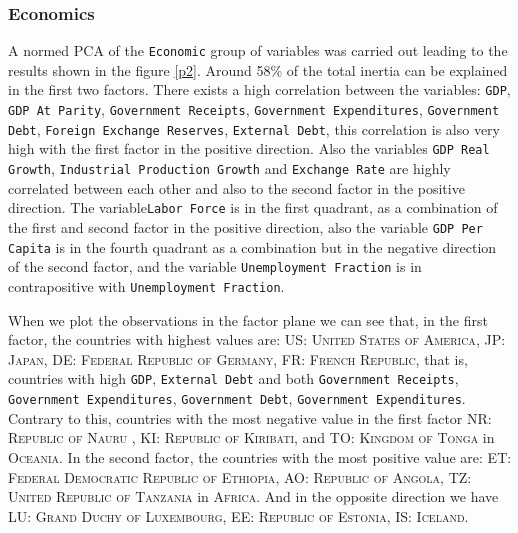\documentclass[a4paper,10pt,twocolumn]{article}
\begin{document}
\subsubsection{Economics}
A normed PCA of the \texttt{Economic} group of variables was carried out leading to the results shown in the figure \ref{p2}. Around 58\% of the total inertia can be explained in the first two factors. There exists a high correlation between the variables: \texttt{GDP}, \texttt{GDP At Parity}, \texttt{Government Receipts}, \texttt{Government Expenditures}, \texttt{Government Debt}, \texttt{Foreign Exchange Reserves}, \texttt{External Debt}, this correlation is also very high with the first factor in the positive direction. Also the variables \texttt{GDP Real Growth}, \texttt{Industrial Production Growth} and \texttt{Exchange Rate} are highly correlated between each other and also to the second factor in the positive direction. The variable\texttt{Labor Force} is in the first quadrant, as a combination of the first and second factor in the positive direction, also the variable \texttt{GDP Per Capita} is in the fourth quadrant as a combination but  in the negative direction of the second factor, and the variable \texttt{Unemployment Fraction} is in contrapositive with \texttt{Unemployment Fraction}. %

When we plot the observations in the factor plane we can see that, in the first factor, the countries with highest values are: \textsc{US: United States of America}, \textsc{JP: Japan}, \textsc{DE: Federal Republic of Germany}, \textsc{FR: French Republic}, that is, countries with high \texttt{GDP}, \texttt{External Debt} and both \texttt{Government Receipts}, \texttt{Government Expenditures}, \texttt{Government Debt}, \texttt{Government Expenditures}. Contrary to this, countries with the most negative value in the first factor \textsc{NR: Republic of Nauru} , \textsc{KI: Republic of Kiribati}, and \textsc{TO: Kingdom of Tonga} in \textsc{Oceania}. In the second factor, the countries with the most positive value are: \textsc{ET: Federal Democratic Republic of Ethiopia}, \textsc{AO: Republic of Angola}, \textsc{TZ: United Republic of Tanzania} in \textsc{Africa}. And in the opposite direction we have \textsc{LU: Grand Duchy of Luxembourg}, \textsc{EE: Republic of Estonia}, \textsc{IS: Iceland}. 
\end{document}
